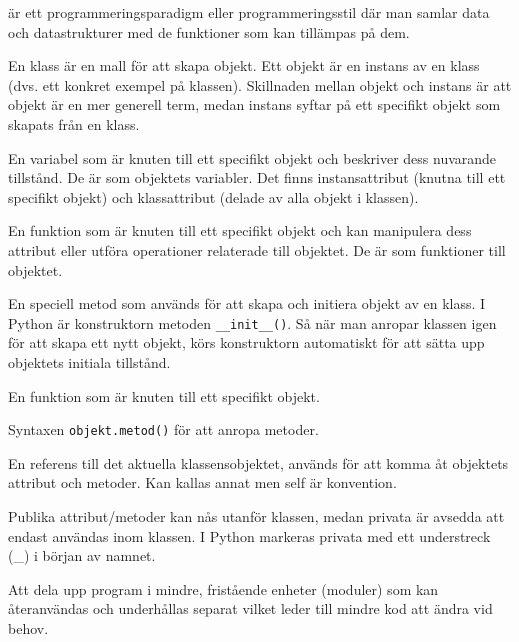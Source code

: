 \documentclass[11pt,a4paper]{article}
\begin{document}
\begin{description}[style=nextline, leftmargin=1cm, labelindent=0.5cm]
    \item[\color{primary}Objektorientering] är ett programmeringsparadigm eller programmeringsstil där man samlar data och datastrukturer med de funktioner som kan tillämpas på dem.
    \item[\color{primary}Klass, objekt, instans] En klass är en mall för att skapa objekt. Ett objekt är en instans av en klass (dvs. ett konkret exempel på klassen). Skillnaden mellan objekt och instans är att objekt är en mer generell term, medan instans syftar på ett specifikt objekt som skapats från en klass. 
    \item[\color{primary}Attribut] En variabel som är knuten till ett specifikt objekt och beskriver dess nuvarande tillstånd. De är som objektets variabler. Det finns instansattribut (knutna till ett specifikt objekt) och klassattribut (delade av alla objekt i klassen).
    \item[\color{primary}Metod] En funktion som är knuten till ett specifikt objekt och kan manipulera dess attribut eller utföra operationer relaterade till objektet. De är som funktioner till objektet.
    \item[\color{primary}Konstruktor] En speciell metod som används för att skapa och initiera objekt av en klass. I Python är konstruktorn metoden \texttt{\_\_init\_\_()}. Så när man anropar klassen igen för att skapa ett nytt objekt, körs konstruktorn automatiskt för att sätta upp objektets initiala tillstånd.
    \item[\color{primary}Metod] En funktion som är knuten till ett specifikt objekt.
    \item[\color{primary}Punktnotation] Syntaxen \texttt{objekt.metod()} för att anropa metoder.
    \item[\color{primary}Self] En referens till det aktuella klassensobjektet, används för att komma åt objektets attribut och metoder. Kan kallas annat men self är konvention.
    \item[\color{primary}Privata och publika attribut/metoder] Publika attribut/metoder kan nås utanför klassen, medan privata är avsedda att endast användas inom klassen. I Python markeras privata med ett understreck (\_) i början av namnet.
    \item[\color{primary}Modulär programmering] Att dela upp program i mindre, fristående enheter (moduler) som kan återanvändas och underhållas separat vilket leder till mindre kod att ändra vid behov.
\end{description}
\end{document}
